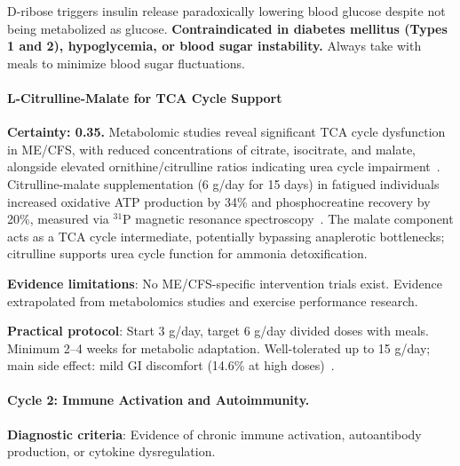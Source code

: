 \begin{warning}
\label{warn:d-ribose-diabetes}
D-ribose triggers insulin release paradoxically lowering blood glucose despite not being metabolized as glucose. \textbf{Contraindicated in diabetes mellitus (Types 1 and 2), hypoglycemia, or blood sugar instability.} Always take with meals to minimize blood sugar fluctuations.
\end{warning}

\paragraph{L-Citrulline-Malate for TCA Cycle Support}

\begin{speculation}
\label{spec:citrulline-malate-tca}
\textbf{Certainty: 0.35.} Metabolomic studies reveal significant TCA cycle dysfunction in ME/CFS, with reduced concentrations of citrate, isocitrate, and malate, alongside elevated ornithine/citrulline ratios indicating urea cycle impairment~\cite{Yamano2016tca_urea}. Citrulline-malate supplementation (6 g/day for 15 days) in fatigued individuals increased oxidative ATP production by 34\% and phosphocreatine recovery by 20\%, measured via $^{31}$P magnetic resonance spectroscopy~\cite{Bendahan2002citrulline}. The malate component acts as a TCA cycle intermediate, potentially bypassing anaplerotic bottlenecks; citrulline supports urea cycle function for ammonia detoxification.

\textbf{Evidence limitations}: No ME/CFS-specific intervention trials exist. Evidence extrapolated from metabolomics studies and exercise performance research.

\textbf{Practical protocol}: Start 3 g/day, target 6 g/day divided doses with meals. Minimum 2--4 weeks for metabolic adaptation. Well-tolerated up to 15 g/day; main side effect: mild GI discomfort (14.6\% at high doses)~\cite{PerezGuisado2010citrulline}.
\end{speculation}

\paragraph{Cycle 2: Immune Activation and Autoimmunity.}

\textbf{Diagnostic criteria}: Evidence of chronic immune activation, autoantibody production, or cytokine dysregulation.

